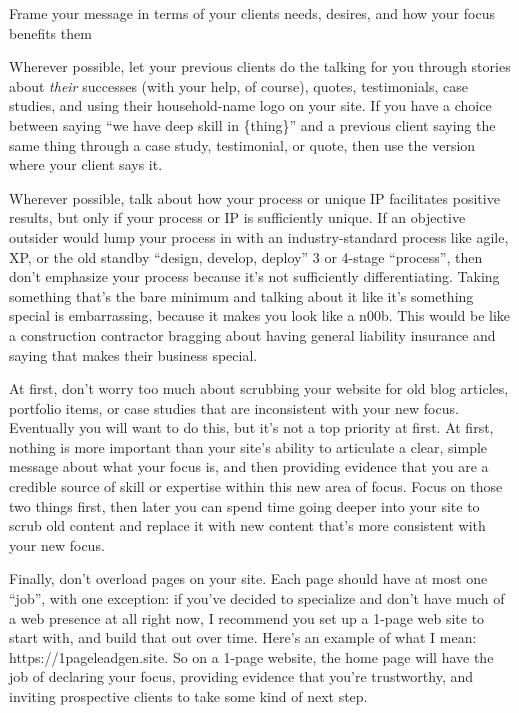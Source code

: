 Frame your message in terms of your clients needs, desires, and how your focus benefits them

Wherever possible, let your previous clients do the talking for you through stories about \emph{their} successes (with your help, of course), quotes, testimonials, case studies, and using their household-name logo on your site. If you have a choice between saying ``we have deep skill in \{thing\}'' and a previous client saying the same thing through a case study, testimonial, or quote, then use the version where your client says it.

Wherever possible, talk about how your process or unique IP facilitates positive results, but only if your process or IP is sufficiently unique. If an objective outsider would lump your process in with an industry-standard process like agile, XP, or the old standby ``design, develop, deploy'' 3 or 4-stage ``process'', then don't emphasize your process because it's not sufficiently differentiating. Taking something that's the bare minimum and talking about it like it's something special is embarrassing, because it makes you look like a n00b. This would be like a construction contractor bragging about having general liability insurance and saying that makes their business special.

At first, don't worry too much about scrubbing your website for old blog articles, portfolio items, or case studies that are inconsistent with your new focus. Eventually you will want to do this, but it's not a top priority at first. At first, nothing is more important than your site's ability to articulate a clear, simple message about what your focus is, and then providing evidence that you are a credible source of skill or expertise within this new area of focus. Focus on those two things first, then later you can spend time going deeper into your site to scrub old content and replace it with new content that's more consistent with your new focus.

Finally, don't overload pages on your site. Each page should have at most one ``job'', with one exception: if you've decided to specialize and don't have much of a web presence at all right now, I recommend you set up a 1-page web site to start with, and build that out over time. Here's an example of what I mean: https://1pageleadgen.site. So on a 1-page website, the home page will have the job of declaring your focus, providing evidence that you're trustworthy, and inviting prospective clients to take some kind of next step.

